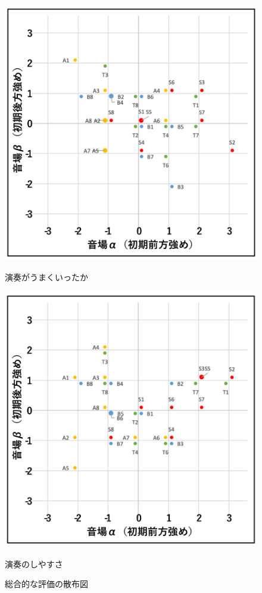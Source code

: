 \documentclass[11pt,a4j]{jreport}
\begin{document}
\begin{figure}[H]
  \begin{minipage}{0.5\linewidth}
    \centering
    \includegraphics[width=.9\linewidth]{images/subjectiveExp/scat_early_12wellDone.pdf}
    \caption*{演奏がうまくいったか}
  \end{minipage}%
  \begin{minipage}{0.5\linewidth}
    \centering
    \includegraphics[width=.9\linewidth]{images/subjectiveExp/scat_early_13easiness.pdf}
    \caption*{演奏のしやすさ}
  \end{minipage}

  \caption{総合的な評価の散布図}
  \label{fig:総合的な評価の散布図}
\end{figure}
\end{document}
